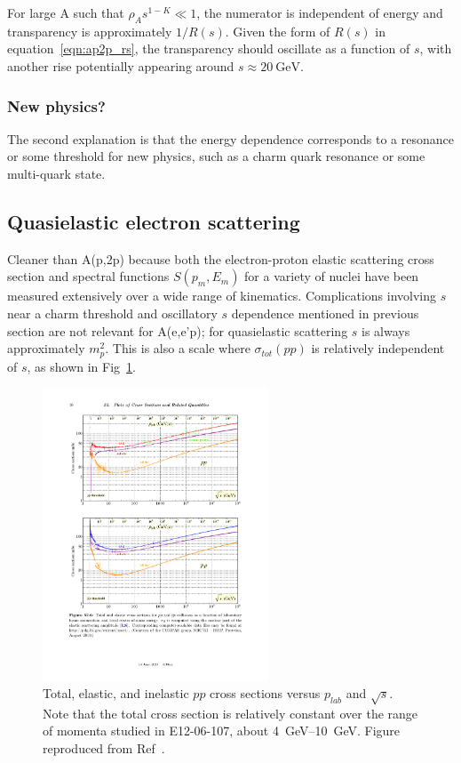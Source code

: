 For large A such that $\rho_As^{1-K}\ll1$, the numerator is independent of
energy and transparency is approximately $1/R(s)$.
Given the form of $R(s)$ in equation~\ref{eqn:ap2p_rs}, the transparency
should oscillate as a function of $s$, with another rise potentially
appearing around $s\approx\SI{20}{\giga\electronvolt}$.

\subsubsection{New physics?}
The second explanation is that the energy dependence corresponds to a resonance
or some threshold for new physics, such as a charm quark resonance or some
multi-quark state.

\subsection{Quasielastic electron scattering}
Cleaner than A(p,2p) because both the electron-proton elastic scattering cross section
and spectral functions $S(p_m,E_m)$ for a variety of nuclei
have been measured extensively over a wide range of kinematics.
Complications involving $s$ near a charm threshold and oscillatory $s$
dependence mentioned in previous section are not relevant for A(e,e'p); for
quasielastic scattering $s$ is always approximately $m_p^2$.
This is also a scale where $\sigma_{tot}(pp)$ is relatively independent of $s$,
as shown in Fig~\ref{fig:pdg_pp_cross_section}.

\begin{figure}[!h]
    \centering
    \includegraphics[width=0.6\textwidth]{chap2/pdg_pp_cross_section.pdf}
    \caption{
             Total, elastic, and inelastic $pp$ cross sections versus
             $p_{lab}$ and $\sqrt{s}$.
             Note that the total cross section is relatively constant over the
             range of momenta studied in E12-06-107, about
             \SIrange{4}{10}{\giga\electronvolt}.
             Figure reproduced from Ref~\cite{pdg_2020}.
            }
    \label{fig:pdg_pp_cross_section}
\end{figure}

